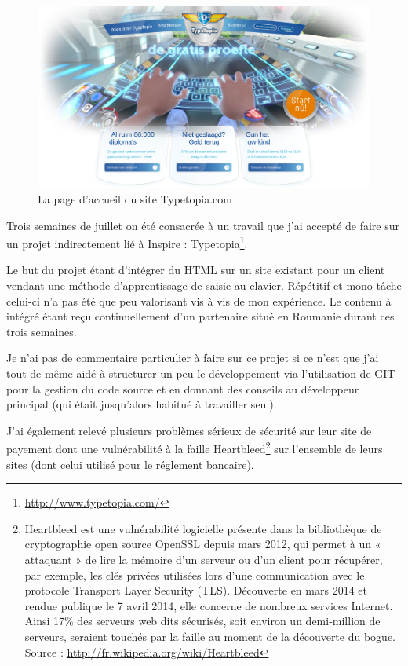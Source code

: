 \documentclass[12pt,a4paper]{book}
\begin{document}
\begin{figure}[htp]
\centering
\includegraphics[scale=0.3]{img/typetopia.png}
 \caption{La page d'accueil du site Typetopia.com}
 \label{fig.typetopia}
\end{figure}

Trois semaines de juillet on été consacrée à un travail que j'ai accepté de faire sur un projet indirectement lié à Inspire : Typetopia\footnote{\url{http://www.typetopia.com/}}.

Le but du projet étant d'intégrer du HTML sur un site existant pour un client vendant une méthode d'apprentissage de saisie au clavier. Répétitif et mono-tâche celui-ci n'a pas été que peu valorisant vis à vis de mon expérience. Le contenu à intégré étant reçu continuellement d'un partenaire situé en Roumanie durant ces trois semaines.

Je n'ai pas de commentaire particulier à faire sur ce projet si ce n'est que j'ai tout de même aidé à structurer un peu le développement via l'utilisation de GIT pour la gestion du code source et en donnant des conseils au développeur principal (qui était jusqu'alors habitué à travailler seul).

J'ai également relevé plusieurs problèmes sérieux de sécurité sur leur site de payement dont une vulnérabilité à la faille Heartbleed\footnote{Heartbleed est une vulnérabilité logicielle présente dans la bibliothèque de cryptographie open source OpenSSL depuis mars 2012, qui permet à un « attaquant » de lire la mémoire d'un serveur ou d'un client pour récupérer, par exemple, les clés privées utilisées lors d'une communication avec le protocole Transport Layer Security (TLS). Découverte en mars 2014 et rendue publique le 7 avril 2014, elle concerne de nombreux services Internet. Ainsi 17\% des serveurs web dits sécurisés, soit environ un demi-million de serveurs, seraient touchés par la faille au moment de la découverte du bogue. Source : \url{http://fr.wikipedia.org/wiki/Heartbleed}} sur l'ensemble de leurs sites (dont celui utilisé pour le réglement bancaire).
\end{document}
